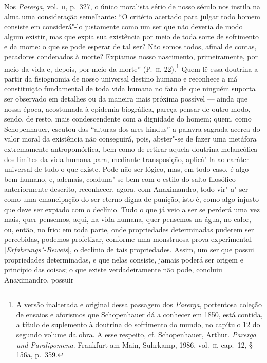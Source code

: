 Nos \textit{Parerga}, vol.~\textsc{ii}, p.~327, o único moralista sério de
nosso século nos instila na alma uma consideração semelhante: ``O critério
acertado para julgar todo homem consiste em considerá"-lo justamente como um
ser que não deveria de modo algum existir, mas que expia sua existência por
meio de toda sorte de sofrimento e da morte: o que se pode esperar de tal
ser? Não somos todos, afinal de contas, pecadores condenados à morte?
Expiamos nosso nascimento, primeiramente, por meio da vida e, depois, por
meio da morte'' (P.~\textsc{ii}, 22).\footnote{A versão inalterada e
original dessa passagem dos \textit{Parerga}, portentosa coleção de ensaios e
aforismos que Schopenhauer dá a conhecer em 1850, está contida, a título de
suplemento à doutrina do sofrimento do mundo, no capítulo 12 do segundo
volume da obra. A esse respeito, cf. Schopenhauer, Arthur. \textit{Parerga 
und Paralipomena}. Frankfurt am Main, Suhrkamp, 1986, vol.~\textsc
{ii}, cap.~12,  § 156a, p.~359.} Quem lê essa doutrina a partir da
fisiognomia de nosso universal destino humano e reconhece a má constituição
fundamental de toda vida humana no fato de que ninguém suporta ser observado
em detalhes ou da maneira mais próxima possível --- ainda que nossa época,
acostumada à epidemia biográfica, pareça pensar de outro modo, sendo, de
resto, mais condescendente com a dignidade do homem; quem, como Schopenhauer,
escutou das ``alturas dos ares hindus'' a palavra sagrada acerca do valor
moral da existência não conseguirá, pois, abster"-se de fazer uma metáfora
extremamente antropomórfica, bem como de retirar aquela doutrina melancólica
dos limites da vida humana para, mediante transposição, aplicá"-la ao caráter
universal de tudo o que existe. Pode não ser lógico, mas, em todo caso, é
algo bem humano, e, ademais, coaduna"-se bem com o estilo do salto filosófico
anteriormente descrito, reconhecer, agora, com Anaximandro, todo vir"-a"-ser
como uma emancipação \label{sereterno} do ser eterno digna de punição, isto
é, como algo injusto que deve ser expiado com o declínio. Tudo o que já veio
a ser se perderá uma vez mais, quer pensemos, aqui, na vida humana, quer
pensemos na água, no calor, ou, então, no frio: em toda parte, onde
propriedades determinadas puderem ser percebidas, podemos profetizar,
conforme uma monstruosa prova experimental [\textit{Erfahrungs"-Beweis}], o
declínio de tais propriedades. Assim, um ser que possui propriedades
determinadas, e que nelas consiste, jamais poderá ser origem e princípio das
coisas; o que existe verdadeiramente não pode, concluiu Anaximandro, possuir
